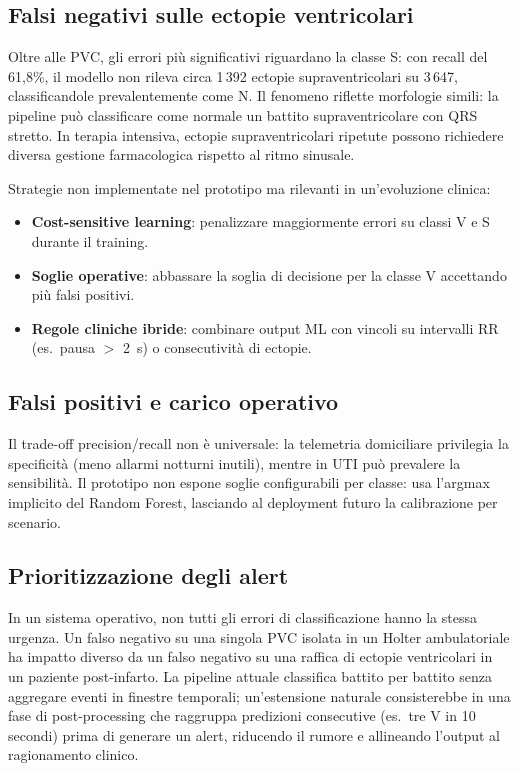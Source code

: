 \subsection{Falsi negativi sulle ectopie ventricolari}

Oltre alle PVC, gli errori più significativi riguardano la classe S: con recall del 61,8\%, il modello non rileva circa 1\,392 ectopie supraventricolari su 3\,647, classificandole prevalentemente come N.
Il fenomeno riflette morfologie simili: la pipeline può classificare come normale un battito supraventricolare con QRS stretto.
In terapia intensiva, ectopie supraventricolari ripetute possono richiedere diversa gestione farmacologica rispetto al ritmo sinusale.

Strategie non implementate nel prototipo ma rilevanti in un'evoluzione clinica:
\begin{itemize}
  \item \textbf{Cost-sensitive learning}: penalizzare maggiormente errori su classi V e S durante il training.
  \item \textbf{Soglie operative}: abbassare la soglia di decisione per la classe V accettando più falsi positivi.
  \item \textbf{Regole cliniche ibride}: combinare output ML con vincoli su intervalli RR (es.\ pausa $>$ 2~s) o consecutività di ectopie.
\end{itemize}

\subsection{Falsi positivi e carico operativo}

Il trade-off precision/recall non è universale: la telemetria domiciliare privilegia la specificità (meno allarmi notturni inutili), mentre in UTI può prevalere la sensibilità.
Il prototipo non espone soglie configurabili per classe: usa l'argmax implicito del Random Forest, lasciando al deployment futuro la calibrazione per scenario.

\subsection{Prioritizzazione degli alert}

In un sistema operativo, non tutti gli errori di classificazione hanno la stessa urgenza.
Un falso negativo su una singola PVC isolata in un Holter ambulatoriale ha impatto diverso da un falso negativo su una raffica di ectopie ventricolari in un paziente post-infarto.
La pipeline attuale classifica battito per battito senza aggregare eventi in finestre temporali; un'estensione naturale consisterebbe in una fase di post-processing che raggruppa predizioni consecutive (es.\ tre V in 10 secondi) prima di generare un alert, riducendo il rumore e allineando l'output al ragionamento clinico.

